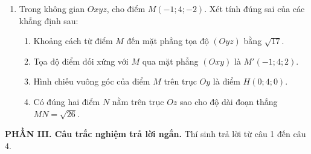 \documentclass[12pt]{article}
\begin{document}
\begin{enumerate}[label=\textbf{Câu \arabic*.}, leftmargin=*]
		\vspace{4mm}
		\item Trong không gian $Oxyz$, cho điểm $M(-1; 4; -2)$. Xét tính đúng sai của các khẳng định sau:
		\begin{enumerate}[label=\alph*)]
			\item Khoảng cách từ điểm $M$ đến mặt phẳng tọa độ $(Oyz)$ bằng $\sqrt{17}$.
			\item Tọa độ điểm đối xứng với $M$ qua mặt phẳng $(Oxy)$ là $M'(-1; 4; 2)$.
			\item Hình chiếu vuông góc của điểm $M$ trên trục $Oy$ là điểm $H(0; 4; 0)$.
			\item Có đúng hai điểm $N$ nằm trên trục $Oz$ sao cho độ dài đoạn thẳng $MN = \sqrt{26}$.
		\end{enumerate}
	\end{enumerate}
	
	\noindent\textbf{PHẦN III. Câu trắc nghiệm trả lời ngắn.} Thí sinh trả lời từ câu 1 đến câu 4.
	\vspace{2mm}
	
\end{document}
